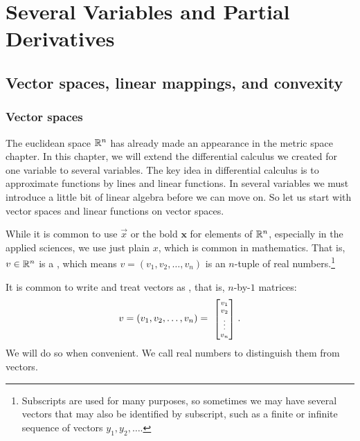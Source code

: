 \chapter{Several Variables and Partial Derivatives} \label{pd:chapter}


\section{Vector spaces, linear mappings, and convexity}
\label{sec:vectorspaces}


\subsection{Vector spaces}

The euclidean space ${\mathbb{R}}^n$ has already made an appearance in the metric
space chapter.  In this chapter, we will extend the differential calculus
we created for one variable to several variables.  The key idea in
differential calculus is to approximate functions by lines and linear
functions.  In several variables we must introduce a little bit of linear
algebra before we can move on.  So
let us start with vector spaces and linear functions on vector spaces.

While it is common to use $\vec{x}$ or the bold
$\mathbf{x}$ for elements of ${\mathbb{R}}^n$,
especially in the applied sciences,
we use just plain $x$, which is common in mathematics.
That is, $v \in {\mathbb{R}}^n$ is a \emph{}, which means 
$v = (v_1,v_2,\ldots,v_n)$ is an $n$-tuple of
real numbers.\footnote{Subscripts are used for many purposes,
so sometimes we may have several vectors that may also
be identified by subscript, such as a finite or infinite sequence of
vectors $y_1,y_2,\ldots$.}

It is common to write and treat vectors as
\emph{}, that is, $n$-by-$1$ matrices:
\begin{equation*}
v =
(v_1,v_2,\ldots,v_n) =
\mbox{ \scriptsize
$\begin{bmatrix}
v_1 \\ v_2 \\ \vdots \\ v_n
\end{bmatrix}$ }.
\end{equation*}
We will do so when convenient.
We call real numbers
\emph{} to distinguish them from vectors.

